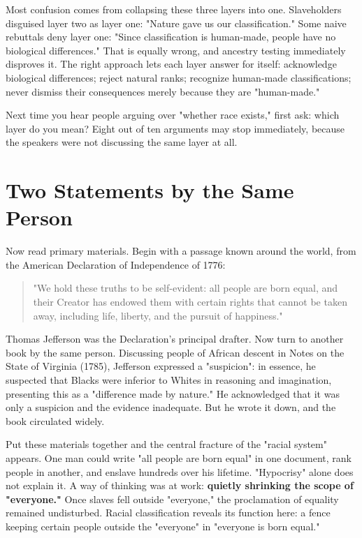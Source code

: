 Most confusion comes from collapsing these three layers into one. Slaveholders disguised layer two as layer one: "Nature gave us our classification." Some naive rebuttals deny layer one: "Since classification is human-made, people have no biological differences." That is equally wrong, and ancestry testing immediately disproves it. The right approach lets each layer answer for itself: acknowledge biological differences; reject natural ranks; recognize human-made classifications; never dismiss their consequences merely because they are "human-made."

Next time you hear people arguing over "whether race exists," first ask: which layer do you mean? Eight out of ten arguments may stop immediately, because the speakers were not discussing the same layer at all.

\section{Two Statements by the Same Person}
Now read primary materials. Begin with a passage known around the world, from the American Declaration of Independence of 1776:

\begin{quote}
"We hold these truths to be self-evident: all people are born equal, and their Creator has endowed them with certain rights that cannot be taken away, including life, liberty, and the pursuit of happiness."
\end{quote}
Thomas Jefferson was the Declaration's principal drafter. Now turn to another book by the same person. Discussing people of African descent in Notes on the State of Virginia (1785), Jefferson expressed a "suspicion": in essence, he suspected that Blacks were inferior to Whites in reasoning and imagination, presenting this as a "difference made by nature." He acknowledged that it was only a suspicion and the evidence inadequate. But he wrote it down, and the book circulated widely.

Put these materials together and the central fracture of the "racial system" appears. One man could write "all people are born equal" in one document, rank people in another, and enslave hundreds over his lifetime. "Hypocrisy" alone does not explain it. A way of thinking was at work: \textbf{quietly shrinking the scope of "everyone."} Once slaves fell outside "everyone," the proclamation of equality remained undisturbed. Racial classification reveals its function here: a fence keeping certain people outside the "everyone" in "everyone is born equal."

